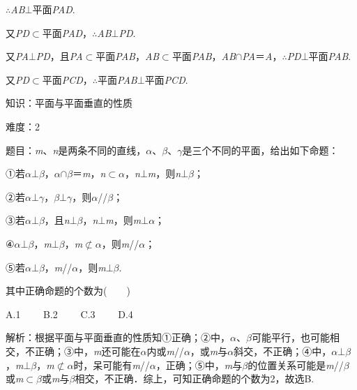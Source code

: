 \documentclass{article} %
\begin{document}
$\mathrm{\therefore}$\textit{AB}$\mathrm{\bot}$平面\textit{PAD}.

又\textit{PD}$\mathrm{\subset }$平面\textit{PAD}，$\mathrm{\therefore}$\textit{AB}$\mathrm{\bot}$\textit{PD}.

又\textit{PA}$\mathrm{\bot}$\textit{PD}，且\textit{PA}$\mathrm{\subset }$平面\textit{PAB}，\textit{AB}$\mathrm{\subset }$平面\textit{PAB}，\textit{AB}$\mathrm{\cap}$\textit{PA}＝\textit{A}，$\mathrm{\therefore}$\textit{PD}$\mathrm{\bot}$平面\textit{PAB}.

又\textit{PD}$\mathrm{\subset }$平面\textit{PCD}，$\mathrm{\therefore}$平面\textit{PAB}$\mathrm{\bot}$平面\textit{PCD}.

知识：平面与平面垂直的性质

难度：2

题目：\textit{m}、\textit{n}是两条不同的直线，\textit{$\alpha$}、\textit{$\beta$}、\textit{$\gamma$}是三个不同的平面，给出如下命题：

①若\textit{$\alpha$}$\mathrm{\bot}$\textit{$\beta$}，\textit{$\alpha$}$\mathrm{\cap}$\textit{$\beta$}＝\textit{m}，\textit{n}$\mathrm{\subset }$\textit{$\alpha$}，\textit{n}$\mathrm{\bot}$\textit{m}，则\textit{n}$\mathrm{\bot}$\textit{$\beta$}；

②若\textit{$\alpha$}$\mathrm{\bot}$\textit{$\gamma$}，\textit{$\beta$}$\mathrm{\bot}$\textit{$\gamma$}，则\textit{$\alpha$}//\textit{$\beta$}；

③若\textit{$\alpha$}$\mathrm{\bot}$\textit{$\beta$}，且\textit{n}$\mathrm{\bot}$\textit{$\beta$}，\textit{n}$\mathrm{\bot}$\textit{m}，则\textit{m}$\mathrm{\bot}$\textit{$\alpha$}；

④\textit{$\alpha$}$\mathrm{\bot}$\textit{$\beta$}，\textit{m}$\mathrm{\bot}$\textit{$\beta$}，\textit{m}$\mathrm{\nsubset}$\textit{$\alpha$}，则\textit{m}//\textit{$\alpha$}；

⑤若\textit{$\alpha$}$\mathrm{\bot}$\textit{$\beta$}，\textit{m}//\textit{$\alpha$}，则\textit{m}$\mathrm{\bot}$\textit{$\beta$}.

其中正确命题的个数为(　　)

A.1　　 B.2　　 C.3　　 D.4

解析：根据平面与平面垂直的性质知①正确；②中，\textit{$\alpha$}、\textit{$\beta$}可能平行，也可能相交，不正确；③中，\textit{m}还可能在\textit{$\alpha$}内或\textit{m}//\textit{$\alpha$}，或\textit{m}与\textit{$\alpha$}斜交，不正确；④中，\textit{$\alpha$}$\mathrm{\bot}$\textit{$\beta$}，\textit{m}$\mathrm{\bot}$\textit{$\beta$}，\textit{m}$\mathrm{\nsubset}$\textit{$\alpha$}时，呆可能有\textit{m}//\textit{$\alpha$}，正确；⑤中，\textit{m}与\textit{$\beta$}的位置关系可能是\textit{m}//\textit{$\beta$}或\textit{m}$\mathrm{\subset }$\textit{$\beta$}或\textit{m}与\textit{$\beta$}相交，不正确．综上，可知正确命题的个数为2，故选B.
\end{document}
